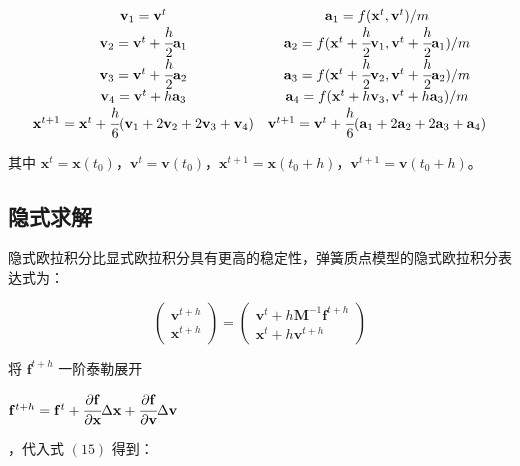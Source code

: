 \documentclass[UTF8]{ctexart}
\begin{document}
\begin{large}
\begin{equation}
\begin{matrix}
\mathbf{v}_1 = \mathbf{v}^t & \mathbf{a}_1 = f(\mathbf{x}^t, \mathbf{v}^t) / m \\
\mathbf{v}_2 = \mathbf{v}^t + \cfrac{h}{2} \mathbf{a}_1 & \mathbf{a}_2 = f(\mathbf{x}^t + \cfrac{h}{2} \mathbf{v}_1, \mathbf{v}^t + \cfrac{h}{2} \mathbf{a}_1) / m \\
\mathbf{v}_3 = \mathbf{v}^t + \cfrac{h}{2} \mathbf{a}_2 & \mathbf{a}_3 = f(\mathbf{x}^t + \cfrac{h}{2} \mathbf{v}_2, \mathbf{v}^t + \cfrac{h}{2} \mathbf{a}_2) / m \\
\mathbf{v}_4 = \mathbf{v}^t + h \mathbf{a}_3 & \mathbf{a}_4 = f(\mathbf{x}^t + h \mathbf{v}_3, \mathbf{v}^t + h \mathbf{a}_3) / m \\
\mathbf{x}^{t+1} = \mathbf{x}^{t} + \cfrac{h}{6}(\mathbf{v}_1 + 2\mathbf{v}_2 + 2\mathbf{v}_3 + \mathbf{v}_4)
& \mathbf{v}^{t+1} = \mathbf{v}^{t} + \cfrac{h}{6}(\mathbf{a}_1 + 2\mathbf{a}_2 + 2\mathbf{a}_3 + \mathbf{a}_4)
\end{matrix}
\end{equation}
\end{large}

其中 $\mathbf{x}^t = \mathbf{x}(t_0)$，$\mathbf{v}^t = \mathbf{v}(t_0)$，$\mathbf{x}^{t+1} = \mathbf{x}(t_0 + h)$，$\mathbf{v}^{t+1} = \mathbf{v}(t_0 + h)$。

\subsection{隐式求解}

隐式欧拉积分比显式欧拉积分具有更高的稳定性，弹簧质点模型的隐式欧拉积分表达式为：

\begin{large}
\begin{equation}
\begin{pmatrix}
\mathbf{v}^{t+h} \\
\mathbf{x}^{t+h}
\end{pmatrix}
=
\begin{pmatrix}
\mathbf{v}^{t} + h \mathbf{M}^{-1} \mathbf{f}^{t+h} \\
\mathbf{x}^{t} + h \mathbf{v} ^ {t+h}
\end{pmatrix}
\end{equation}
\end{large}

将 $ \mathbf{f}^{t+h}$ 一阶泰勒展开 \begin{large} $ \mathbf{f}^{t+h} =  \mathbf{f}^{t} + \cfrac{\partial \mathbf{f}}{\partial \mathbf{x}} \Delta \mathbf{x} + \cfrac{\partial \mathbf{f}}{\partial \mathbf{v}} \Delta \mathbf{v}$\end{large}，代入式 $(15)$ 得到：
\end{document}
